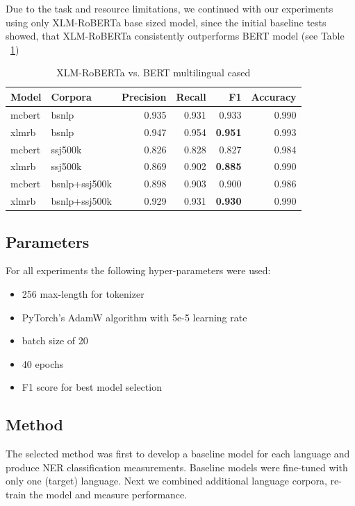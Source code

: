 \documentclass[sigconf]{acmart}
\begin{document}
Due to the task and resource limitations, we continued with our experiments using only XLM-RoBERTa base sized model,
since the initial baseline tests showed, that XLM-RoBERTa consistently outperforms BERT model (see Table ~\ref{tab:roberta_vs_bert})

\begin{table}[H]
  \caption{XLM-RoBERTa vs. BERT multilingual cased}
  \label{tab:roberta_vs_bert}
  \begin{tabular}{llrrrr}
    \toprule
    Model&Corpora&Precision&Recall&F1&Accuracy\\
    \midrule
    mcbert&bsnlp&0.935&0.931&0.933&0.990\\
    xlmrb&bsnlp&0.947&0.954&\textbf{0.951}&0.993\\
    \midrule
    mcbert&ssj500k&0.826&0.828&0.827&0.984\\
    xlmrb&ssj500k&0.869&0.902&\textbf{0.885}&0.990\\
    \midrule
    mcbert&bsnlp+ssj500k&0.898&0.903&0.900&0.986\\
    xlmrb&bsnlp+ssj500k&0.929&0.931&\textbf{0.930}&0.990\\
    \bottomrule
  \end{tabular}
\end{table}

\subsection{Parameters}
For all experiments the following hyper-parameters were used:
\begin{itemize}
  \item 256 max-length for tokenizer
  \item PyTorch's AdamW algorithm with 5e-5 learning rate
  \item batch size of 20
  \item 40 epochs
  \item F1 score for best model selection
\end{itemize}

\subsection{Method}
The selected method was first to develop a baseline model for each language and produce NER classification measurements.
Baseline models were fine-tuned with only one (target) language.
Next we combined additional language corpora, re-train the model and measure performance.
\end{document}
